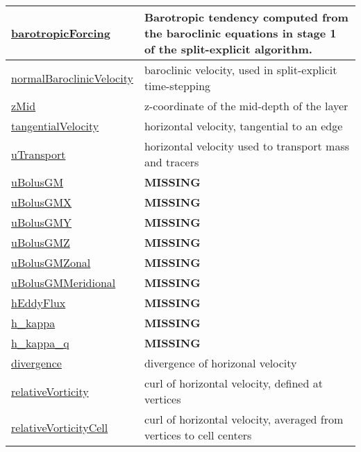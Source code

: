 {\begin{center}
\begin{longtable}{| p{2.0in} | p{4.0in} |}
	\hline
	\hyperref[subsec:var_sec_state_barotropicForcing]{barotropicForcing} & Barotropic tendency computed from the baroclinic equations in stage 1 of the split-explicit algorithm. \\
	\hline
	\hyperref[subsec:var_sec_state_normalBaroclinicVelocity]{normalBaroclinicVelocity} & baroclinic velocity, used in split-explicit time-stepping \\
	\hline
	\hyperref[subsec:var_sec_state_zMid]{zMid} & z-coordinate of the mid-depth of the layer \\
	\hline
	\hyperref[subsec:var_sec_state_tangentialVelocity]{tangentialVelocity} & horizontal velocity, tangential to an edge \\
	\hline
	\hyperref[subsec:var_sec_state_uTransport]{uTransport} & horizontal velocity used to transport mass and tracers \\
	\hline
	\hyperref[subsec:var_sec_state_uBolusGM]{uBolusGM} & {\bf \color{red} MISSING} \\
	\hline
	\hyperref[subsec:var_sec_state_uBolusGMX]{uBolusGMX} & {\bf \color{red} MISSING} \\
	\hline
	\hyperref[subsec:var_sec_state_uBolusGMY]{uBolusGMY} & {\bf \color{red} MISSING} \\
	\hline
	\hyperref[subsec:var_sec_state_uBolusGMZ]{uBolusGMZ} & {\bf \color{red} MISSING} \\
	\hline
	\hyperref[subsec:var_sec_state_uBolusGMZonal]{uBolusGMZonal} & {\bf \color{red} MISSING} \\
	\hline
	\hyperref[subsec:var_sec_state_uBolusGMMeridional]{uBolusGMMeridional} & {\bf \color{red} MISSING} \\
	\hline
	\hyperref[subsec:var_sec_state_hEddyFlux]{hEddyFlux} & {\bf \color{red} MISSING} \\
	\hline
	\hyperref[subsec:var_sec_state_h_kappa]{h\_kappa} & {\bf \color{red} MISSING} \\
	\hline
	\hyperref[subsec:var_sec_state_h_kappa_q]{h\_kappa\_q} & {\bf \color{red} MISSING} \\
	\hline
	\hyperref[subsec:var_sec_state_divergence]{divergence} & divergence of horizonal velocity \\
	\hline
	\hyperref[subsec:var_sec_state_relativeVorticity]{relativeVorticity} & curl of horizontal velocity, defined at vertices \\
	\hline
	\hyperref[subsec:var_sec_state_relativeVorticityCell]{relativeVorticityCell} & curl of horizontal velocity, averaged from vertices to cell centers \\

\end{longtable}
\end{center}}
